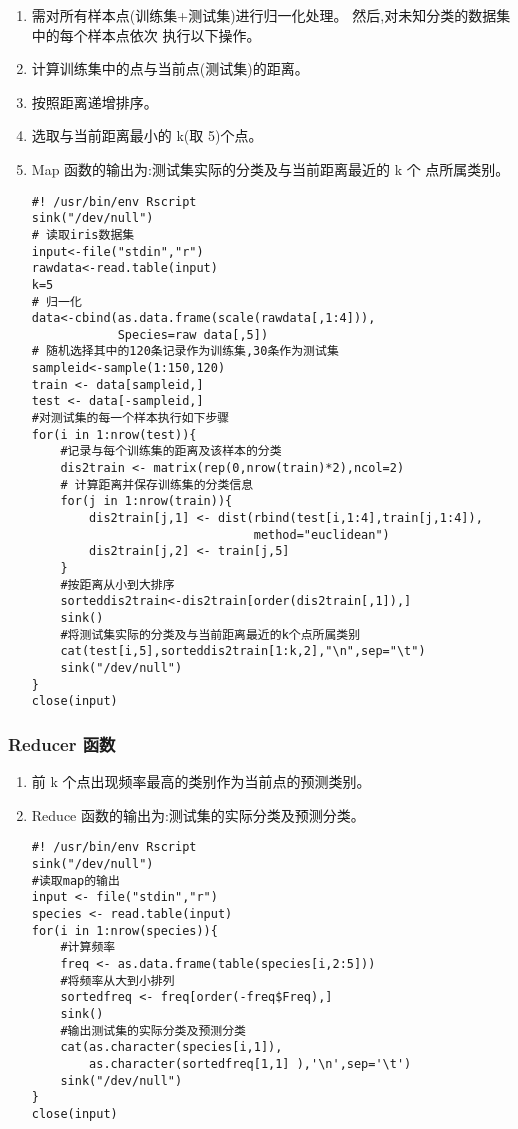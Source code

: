 \begin{enumerate}
\def\labelenumi{\arabic{enumi}.}
\item
  需对所有样本点(训练集+测试集)进行归一化处理。
  然后,对未知分类的数据集中的每个样本点依次 执行以下操作。
\item
  计算训练集中的点与当前点(测试集)的距离。
\item
  按照距离递增排序。
\item
  选取与当前距离最小的 k(取 5)个点。
\item
  Map 函数的输出为:测试集实际的分类及与当前距离最近的 k 个 点所属类别。

\begin{lstlisting}
#! /usr/bin/env Rscript
sink("/dev/null")
# 读取iris数据集
input<-file("stdin","r")
rawdata<-read.table(input)
k=5
# 归一化
data<-cbind(as.data.frame(scale(rawdata[,1:4])),
            Species=raw data[,5])
# 随机选择其中的120条记录作为训练集,30条作为测试集
sampleid<-sample(1:150,120)
train <- data[sampleid,]
test <- data[-sampleid,]
#对测试集的每一个样本执行如下步骤
for(i in 1:nrow(test)){
    #记录与每个训练集的距离及该样本的分类
    dis2train <- matrix(rep(0,nrow(train)*2),ncol=2)
    # 计算距离并保存训练集的分类信息
    for(j in 1:nrow(train)){
        dis2train[j,1] <- dist(rbind(test[i,1:4],train[j,1:4]),
                               method="euclidean")
        dis2train[j,2] <- train[j,5]
    }
    #按距离从小到大排序
    sorteddis2train<-dis2train[order(dis2train[,1]),]
    sink()
    #将测试集实际的分类及与当前距离最近的k个点所属类别
    cat(test[i,5],sorteddis2train[1:k,2],"\n",sep="\t")
    sink("/dev/null")
}
close(input)
\end{lstlisting}
\end{enumerate}

\subsubsection{Reducer 函数}\label{reducer-ux51fdux6570}

\begin{enumerate}
\def\labelenumi{\arabic{enumi}.}
\item
  前 k 个点出现频率最高的类别作为当前点的预测类别。
\item
  Reduce 函数的输出为:测试集的实际分类及预测分类。

\begin{lstlisting}
#! /usr/bin/env Rscript
sink("/dev/null")
#读取map的输出
input <- file("stdin","r")
species <- read.table(input)
for(i in 1:nrow(species)){
    #计算频率
    freq <- as.data.frame(table(species[i,2:5]))
    #将频率从大到小排列
    sortedfreq <- freq[order(-freq$Freq),]
    sink()
    #输出测试集的实际分类及预测分类
    cat(as.character(species[i,1]),
        as.character(sortedfreq[1,1] ),'\n',sep='\t')
    sink("/dev/null")
}
close(input)
\end{lstlisting}
\end{enumerate}

